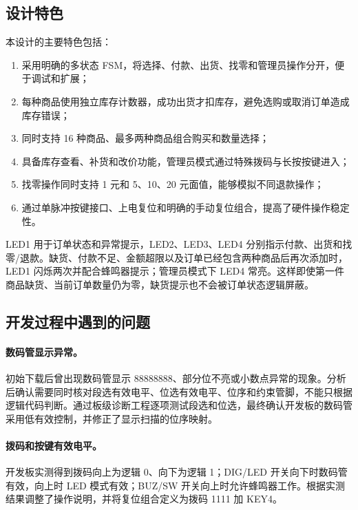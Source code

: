 \documentclass[UTF8,a4paper,12pt]{ctexart}
\begin{document}
\subsection{设计特色}

本设计的主要特色包括：

\begin{enumerate}
  \item 采用明确的多状态 FSM，将选择、付款、出货、找零和管理员操作分开，便于调试和扩展；
  \item 每种商品使用独立库存计数器，成功出货才扣库存，避免选购或取消订单造成库存错误；
  \item 同时支持 16 种商品、最多两种商品组合购买和数量选择；
  \item 具备库存查看、补货和改价功能，管理员模式通过特殊拨码与长按按键进入；
  \item 找零操作同时支持 1 元和 5、10、20 元面值，能够模拟不同退款操作；
  \item 通过单脉冲按键接口、上电复位和明确的手动复位组合，提高了硬件操作稳定性。
\end{enumerate}

LED1 用于订单状态和异常提示，LED2、LED3、LED4 分别指示付款、出货和找零/退款。缺货、付款不足、金额超限以及订单已经包含两种商品后再次添加时，LED1 闪烁两次并配合蜂鸣器提示；管理员模式下 LED4 常亮。这样即使第一件商品缺货、当前订单数量仍为零，缺货提示也不会被订单状态逻辑屏蔽。

\subsection{开发过程中遇到的问题}

\paragraph{数码管显示异常。}
初始下载后曾出现数码管显示 88888888、部分位不亮或小数点异常的现象。分析后确认需要同时核对段选有效电平、位选有效电平、位序和约束管脚，不能只根据逻辑代码判断。通过板级诊断工程逐项测试段选和位选，最终确认开发板的数码管采用低有效控制，并修正了显示扫描的位序映射。

\paragraph{拨码和按键有效电平。}
开发板实测得到拨码向上为逻辑 0、向下为逻辑 1；DIG/LED 开关向下时数码管有效，向上时 LED 模式有效；BUZ/SW 开关向上时允许蜂鸣器工作。根据实测结果调整了操作说明，并将复位组合定义为拨码 1111 加 KEY4。
\end{document}

